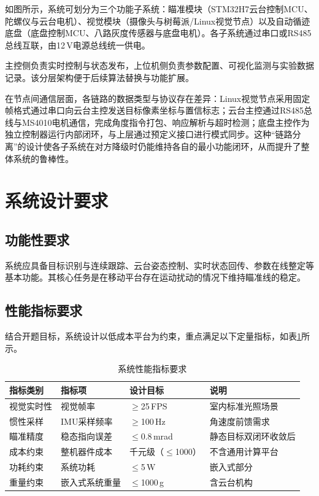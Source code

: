 如图所示，系统可划分为三个功能子系统：瞄准模块（STM32H7云台控制MCU、陀螺仪与云台电机）、视觉模块（摄像头与树莓派/Linux视觉节点）以及自动循迹底盘（底盘控制MCU、八路灰度传感器与底盘电机）。各子系统通过串口或RS485总线互联，由12\,V电源总线统一供电。

主控侧负责实时控制与状态发布，上位机侧负责参数配置、可视化监测与实验数据记录。该分层架构便于后续算法替换与功能扩展。

在节点间通信层面，各链路的数据类型与协议存在差异：Linux视觉节点采用固定帧格式通过串口向云台主控发送目标像素坐标与置信标志；云台主控通过RS485总线与MS4010电机通信，完成角度指令打包、响应解析与超时检测；底盘主控作为独立控制器运行内部闭环，与上层通过预定义接口进行模式同步。这种``链路分离''的设计使各子系统在对方降级时仍能维持各自的最小功能闭环，从而提升了整体系统的鲁棒性。

\section{系统设计要求}

\subsection{功能性要求}

系统应具备目标识别与连续跟踪、云台姿态控制、实时状态回传、参数在线整定等基本功能。其核心任务是在移动平台存在运动扰动的情况下维持瞄准线的稳定。

\subsection{性能指标要求}

结合开题目标，系统设计以低成本平台为约束，重点满足以下定量指标，如表\ref{tab:performance_requirements}所示。

\begin{table}[htbp]
\centering
\caption{系统性能指标要求}
\label{tab:performance_requirements}
\begin{tabular}{llll}
\hline
指标类别 & 指标项 & 设计目标 & 说明 \\
\hline
视觉实时性 & 视觉帧率 & $\geq$25\,FPS & 室内标准光照场景 \\
惯性采样 & IMU采样频率 & $\geq$100\,Hz & 角速度前馈需求 \\
瞄准精度 & 稳态指向误差 & $\leq$0.8\,mrad & 静态目标双闭环收敛后 \\
成本约束 & 整机器件成本 & 千元级（$\leq$\yen{}1000） & 不含通用计算平台 \\
功耗约束 & 系统功耗 & $\leq$5\,W & 嵌入式部分 \\
重量约束 & 嵌入式系统重量 & $\leq$1000\,g & 含云台机构 \\
\hline
\end{tabular}
\end{table}

